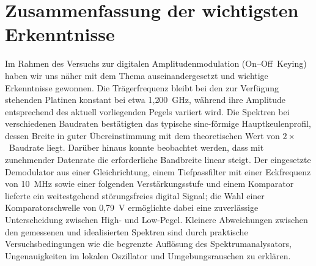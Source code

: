 \section{Zusammenfassung der wichtigsten Erkenntnisse}
Im Rahmen des Versuchs zur digitalen Amplitudenmodulation (On--Off~Keying) haben wir uns näher mit dem Thema auseinandergesetzt und wichtige Erkenntnisse gewonnen. Die Trägerfrequenz bleibt bei den zur Verfügung stehenden Platinen konstant bei etwa 1{,}200~GHz, während ihre Amplitude entsprechend des aktuell vorliegenden Pegels variiert wird.
Die Spektren bei verschiedenen Baudraten bestätigten das typische sinc-förmige Hauptkeulenprofil, dessen Breite in guter Übereinstimmung mit dem theoretischen Wert von $2 \times$~Baudrate liegt. 
Darüber hinaus konnte beobachtet werden, dass mit zunehmender Datenrate die erforderliche Bandbreite linear steigt.
Der eingesetzte Demodulator aus einer Gleichrichtung, einem Tiefpassfilter mit einer Eckfrequenz von 10~MHz sowie einer folgenden Verstärkungsstufe und einem Komparator lieferte ein weitestgehend störungsfreies digital Signal; die Wahl einer Komparatorschwelle von 0,79~V ermöglichte dabei eine zuverlässige Unterscheidung zwischen High- und Low-Pegel. Kleinere Abweichungen zwischen den gemessenen und idealisierten Spektren sind durch praktische Versuchsbedingungen wie die begrenzte Auflösung des Spektrumanalysators, Ungenauigkeiten im lokalen Oszillator und Umgebungsrauschen zu erklären.

\clearpage
